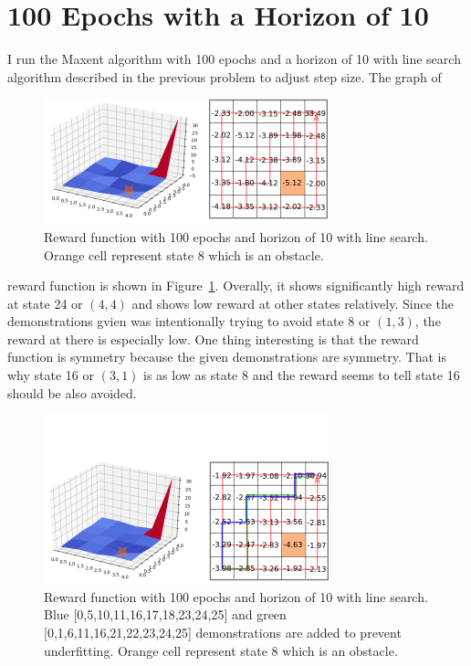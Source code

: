 \documentclass[11pt]{article}
\begin{document}
\section{100 Epochs with a Horizon of 10}
\label{sec:100_epochs_with_a_horizon_of_10}
I run the Maxent algorithm with 100 epochs and a horizon of 10 with line search
algorithm described in the previous problem to adjust step size. The graph of
\begin{figure}[htpb]
    \centering
    \includegraphics[width=0.8\linewidth]{figures/reward.png}
    \caption{Reward function with 100 epochs and horizon of 10 with line search.
            Orange cell represent state 8 which is an obstacle.}
    \label{fig:figures/reward}
\end{figure}
reward function is shown in Figure~\ref{fig:figures/reward}. Overally, it shows
significantly high reward at state 24 or $(4,4)$ and shows low reward at other states
relatively. Since the demonstrations gvien was intentionally trying to
avoid state 8 or $(1,3)$, the reward at there is especially low. One thing interesting
is that the reward function is symmetry because the given demonstrations are
symmetry. That is why state 16 or $(3,1)$ is as low as state 8 and the reward
seems to tell state 16 should be also avoided.
\begin{figure}[htpb]
    \centering
    \includegraphics[width=0.8\linewidth]{figures/reward1.png}
    \caption{Reward function with 100 epochs and horizon of 10 with line search.
        Blue [0,5,10,11,16,17,18,23,24,25] and green [0,1,6,11,16,21,22,23,24,25] demonstrations are added to prevent underfitting.
            Orange cell represent state 8 which is an obstacle.}
    \label{fig:reward1}
\end{figure}
\end{document}
